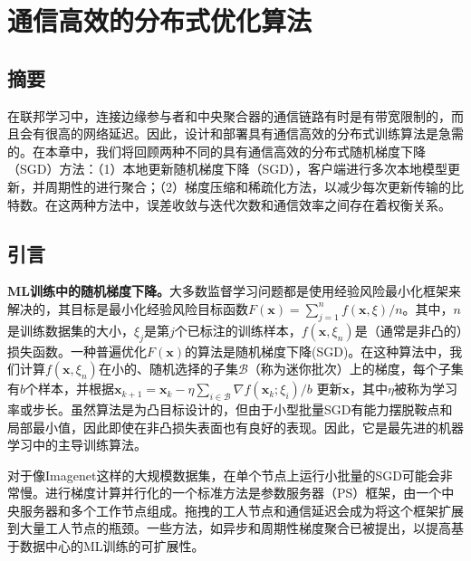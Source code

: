 \chapter{通信高效的分布式优化算法}
\author{Gauri Joshi and Shiqiang Wang}

\section*{摘要}
在联邦学习中，连接边缘参与者和中央聚合器的通信链路有时是有带宽限制的，而且会有很高的网络延迟。因此，设计和部署具有通信高效的分布式训练算法是急需的。在本章中，我们将回顾两种不同的具有通信高效的分布式随机梯度下降（SGD）方法：（1）本地更新随机梯度下降（SGD），客户端进行多次本地模型更新，并周期性的进行聚合；（2）梯度压缩和稀疏化方法，以减少每次更新传输的比特数。在这两种方法中，误差收敛与迭代次数和通信效率之间存在着权衡关系。

\section{引言}

\textbf{ML训练中的随机梯度下降。}大多数监督学习问题都是使用经验风险最小化框架来解决的\cite{boyd2004convex, shalev2014understanding}，其目标是最小化经验风险目标函数$F(\bm{x}) = \sum_{j=1}^{n} f(\bm{x}, \xi) / n$。其中，$n$是训练数据集的大小，$\xi_{j}$是第$j$个已标注的训练样本，$f(\bm{x},\xi_{n})$是（通常是非凸的）损失函数。一种普遍优化$F(\bm{x})$的算法是随机梯度下降(SGD)。在这种算法中，我们计算$f(\bm{x},\xi_{n})$在小的、随机选择的子集$\mathcal{B}$（称为迷你批次）上的梯度，每个子集有$b$个样本\cite{bottou2018optimization, dekel2012optimal, li2014efficient, robbins1951stochastic, ruder2016overview, pmlr-v84-yin18a}，并根据$\bm{x}_{k+1} = \bm{x}_{k} - \eta \sum_{i \in \mathcal{B}} \nabla f(\bm{x}_{k};\xi_{i})/b$ 更新$\bm{x}$，其中$\eta$被称为学习率或步长。虽然算法是为凸目标设计的，但由于小型批量SGD有能力摆脱鞍点和局部最小值\cite{chaudhari2018stochastic, neyshabur2017geometry, shwartzziv2017opening, zhang2021understanding}，因此即使在非凸损失表面也有良好的表现。因此，它是最先进的机器学习中的主导训练算法。

对于像Imagenet\cite{russakovsky2015imagenet}这样的大规模数据集，在单个节点上运行小批量的SGD可能会非常慢。进行梯度计算并行化的一个标准方法是参数服务器（PS）框架\cite{dean2012large}，由一个中央服务器和多个工作节点组成。拖拽的工人节点和通信延迟会成为将这个框架扩展到大量工人节点的瓶颈。一些方法，如异步\cite{cui2014exploiting, dutta2018slow, gupta2016model, zhang2017yellowfin}和周期性梯度聚合\cite{stich2018local, wang2019cooperative, yu2019parallel}已被提出，以提高基于数据中心的ML训练的可扩展性。

